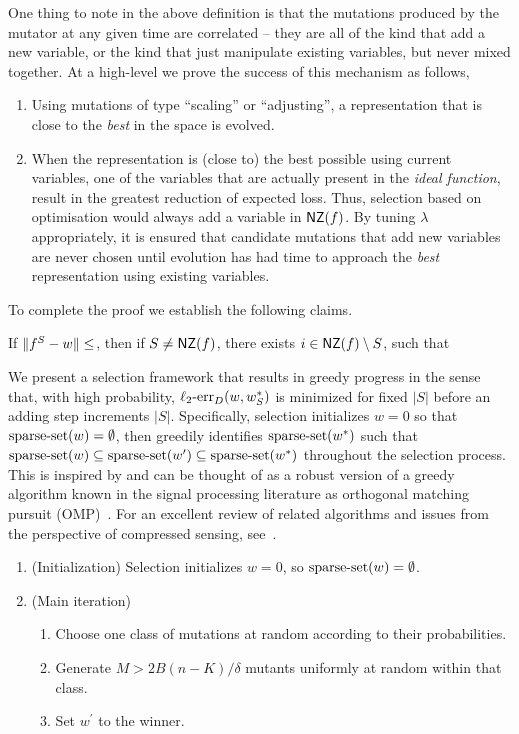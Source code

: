 One thing to note in the above definition is that the mutations produced by the
mutator at any given time are correlated -- \ie they are all of the kind that
add a new variable, or the kind that just manipulate existing variables, but
never mixed together. At a high-level we prove the success of this mechanism as
follows, 
\begin{enumerate}
\item Using mutations of type ``scaling'' or ``adjusting'', a representation
that is close to the \emph{best} in the space is evolved.
\item When the representation is (close to) the best possible using current
variables, one of the variables that are actually present in the \emph{ideal
function}, result in the greatest reduction of expected loss. Thus, selection
based on optimisation would always add a variable in $\mathsf{NZ}(f)$. By tuning
$\lambda$ appropriately, it is ensured that candidate mutations that add new
variables are never chosen until evolution has had time to approach the
\emph{best} representation using existing variables.
\end{enumerate}

To complete the proof we establish the following claims.
\begin{claim} \label{claim:date} If $\Vert f^S - w \Vert \leq $, then if $S \neq \mathsf{NZ}(f)$, there exists $i \in \mathsf{NZ}(f) \setminus S$, such
that 

\end{claim}


We present a selection framework that results in greedy progress in the sense
that, with high probability, $\mathrm{\ell_2\mbox{-}err}_D(w, w^*_S)$ is minimized for fixed $|S|$
before an adding step increments $|S|$.
Specifically, selection initializes $w = 0$ so that $\mathrm{sparse\mbox{-}set}(w) = \emptyset$,
then greedily identifies $\mathrm{sparse\mbox{-}set}(w^*)$ such that
$\mathrm{sparse\mbox{-}set}(w) \subseteq \mathrm{sparse\mbox{-}set}(w^\prime) \subseteq \mathrm{sparse\mbox{-}set}(w^*)$
throughout the selection process.
This is inspired by and can be thought of as a robust version of a
greedy algorithm known in the signal processing literature as
orthogonal matching pursuit (OMP)~\cite{Tropp:2004-greed,Donoho:2006-recovery}.
For an excellent review of related algorithms and issues from the perspective
of compressed sensing, see~\cite{Donoho:2009-sparse}.

\begin{enumerate}
\item (Initialization) Selection initializes $w = 0$, so $\mathrm{sparse\mbox{-}set}(w) = \emptyset$.
\item (Main iteration)
	\begin{enumerate}
	\item Choose one class of mutations at random according to their probabilities.
	\item Generate $M > 2B(n - K) / \delta$  mutants uniformly at random within that class.
	\item Set $w^\prime$ to the winner.
	\end{enumerate}
\end{enumerate}

